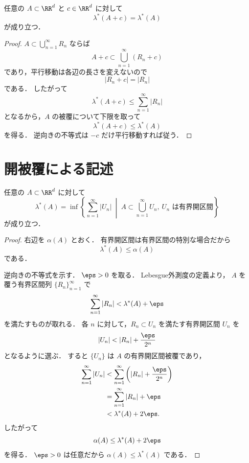 \begin{proposition}[平行移動不変性]
任意の $A \subset \RR^d$ と $c \in \RR^d$ に対して
\[
\lambda^*(A+c)=\lambda^*(A)
\]
が成り立つ．
\end{proposition}
\begin{proof}
$A \subset \bigcup_{n=1}^{\infty} R_n$ ならば
\[
A+c \subset \bigcup_{n=1}^{\infty} (R_n+c)
\]
であり，平行移動は各辺の長さを変えないので
\[
|R_n+c| = |R_n|
\]
である．
したがって
\[
\lambda^*(A+c) \le \sum_{n=1}^{\infty} |R_n|
\]
となるから，$A$ の被覆について下限を取って
\[
\lambda^*(A+c) \le \lambda^*(A)
\]
を得る．
逆向きの不等式は $-c$ だけ平行移動すれば従う．
\end{proof}

\section{開被覆による記述}

\begin{theorem}[開区間被覆による記述]
任意の $A \subset \RR^d$ に対して
\[
\lambda^*(A)
=
\inf\left\{
\sum_{n=1}^{\infty} |U_n|
\;\middle|\;
A \subset \bigcup_{n=1}^{\infty} U_n,\ 
U_n \text{ は有界開区間}
\right\}
\]
が成り立つ．
\end{theorem}
\begin{proof}
右辺を $\alpha(A)$ とおく．
有界開区間は有界区間の特別な場合だから
\[
\lambda^*(A)\le \alpha(A)
\]
である．

逆向きの不等式を示す．
$\eps>0$ を取る．
Lebesgue外測度の定義より，
$A$ を覆う有界区間列 $\{R_n\}_{n=1}^{\infty}$ で
\[
\sum_{n=1}^{\infty}|R_n|<\lambda^*(A)+\eps
\]
を満たすものが取れる．
各 $n$ に対して，$R_n \subset U_n$ を満たす有界開区間 $U_n$ を
\[
|U_n|<|R_n|+\frac{\eps}{2^n}
\]
となるように選ぶ．
すると $\{U_n\}$ は $A$ の有界開区間被覆であり，
\begin{align*}
\sum_{n=1}^{\infty}|U_n|
&<
\sum_{n=1}^{\infty}\left(|R_n|+\frac{\eps}{2^n}\right) \\
&=
\sum_{n=1}^{\infty}|R_n|+\eps \\
&<
\lambda^*(A)+2\eps.
\end{align*}
したがって
\[
\alpha(A)\le \lambda^*(A)+2\eps
\]
を得る．
$\eps>0$ は任意だから $\alpha(A)\le \lambda^*(A)$ である．
\end{proof}

